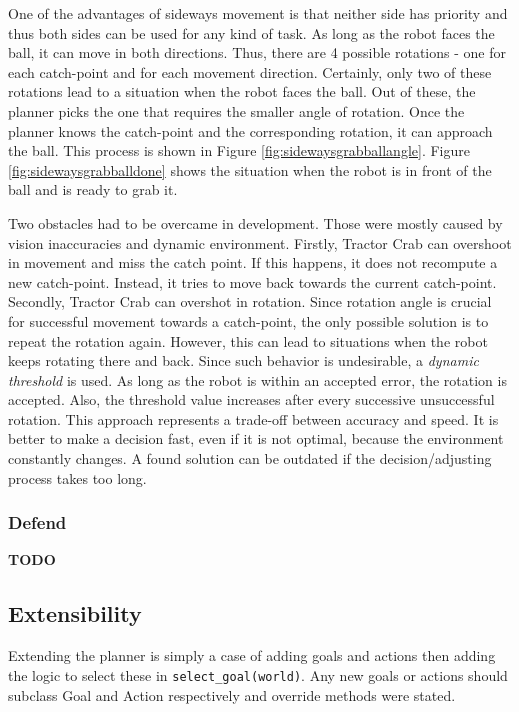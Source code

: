 One of the advantages of sideways movement is that neither side has priority
and thus both sides can be used for any kind of task. As long as the robot
faces the ball, it can move in both directions. Thus, there are 4 possible
rotations - one for each catch-point and for each movement direction.
Certainly, only two of these rotations lead to a situation when the robot faces
the ball. Out of these, the planner picks the one that requires the smaller
angle of rotation. Once the planner knows the catch-point and the corresponding
rotation, it can approach the ball. This process is shown in Figure
\ref{fig:sidewaysgrabballangle}. Figure \ref{fig:sidewaysgrabballdone} shows
the situation when the robot is in front of the ball and is ready to grab it.

Two obstacles had to be overcame in development. Those were mostly caused by
vision inaccuracies and dynamic environment. Firstly, Tractor Crab can
overshoot in movement and miss the catch point. If this happens, it does not
recompute a new catch-point. Instead, it tries to move back towards the current
catch-point. Secondly, Tractor Crab can overshot in rotation. Since rotation
angle is crucial for successful movement towards a catch-point, the only
possible solution is to repeat the rotation again. However, this can lead to
situations when the robot keeps rotating there and back. Since such behavior is
undesirable, a \emph{dynamic threshold} is used. As long as the robot is within
an accepted error, the rotation is accepted. Also, the threshold value
increases after every successive unsuccessful rotation. This approach
represents a trade-off between accuracy and speed. It is better to make a
decision fast, even if it is not optimal, because the environment constantly
changes. A found solution can be outdated if the decision/adjusting process
takes too long.

\subsubsection{Defend}

\textbf{TODO}

\subsection{Extensibility}

Extending the planner is simply a case of adding goals and actions then adding
the logic to select these in \texttt{select\_goal(world)}. Any new goals or
actions should subclass Goal and Action respectively and override methods were
stated.

